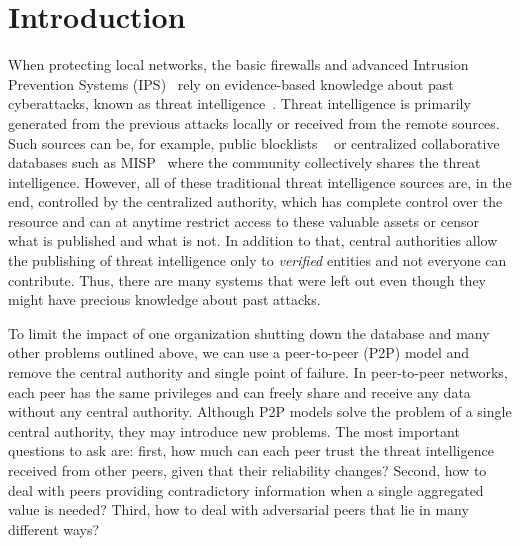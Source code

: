 \chapter{Introduction}
\label{ch:introduction}



When protecting local networks, the basic firewalls and advanced Intrusion Prevention Systems (IPS)~\cite{zhang2004intrusion} rely on evidence-based knowledge about past cyberattacks, known as threat intelligence~\cite{threatintelligence}. Threat intelligence is primarily generated from the previous attacks locally or received from the remote sources.
Such sources can be, for example, public blocklists ~\cite{abuseipdb, dataplane, binarydefense} or centralized collaborative databases such as MISP~\cite{wagner2016misp} where the community collectively shares the threat intelligence.
However, all of these traditional threat intelligence sources are, in the end, controlled by the centralized authority, which has complete control over the resource and can at anytime restrict access to these valuable assets or censor what is published and what is not.
In addition to that, central authorities allow the publishing of threat intelligence only to \textit{verified} entities and not everyone can contribute. Thus, there are many systems that were left out even though they might have precious knowledge about past attacks.

To limit the impact of one organization shutting down the database and many other problems outlined above, we can use a peer-to-peer (P2P) model and remove the central authority and single point of failure.
In peer-to-peer networks, each peer has the same privileges and can freely share and receive any data without any central authority.
Although P2P models solve the problem of a single central authority, they may introduce new problems. The most important questions to ask are: first, how much can each peer trust the threat intelligence received from other peers, given that their reliability changes? Second, how to deal with peers providing contradictory information when a single aggregated value is needed? Third, how to deal with adversarial peers that lie in many different ways?

